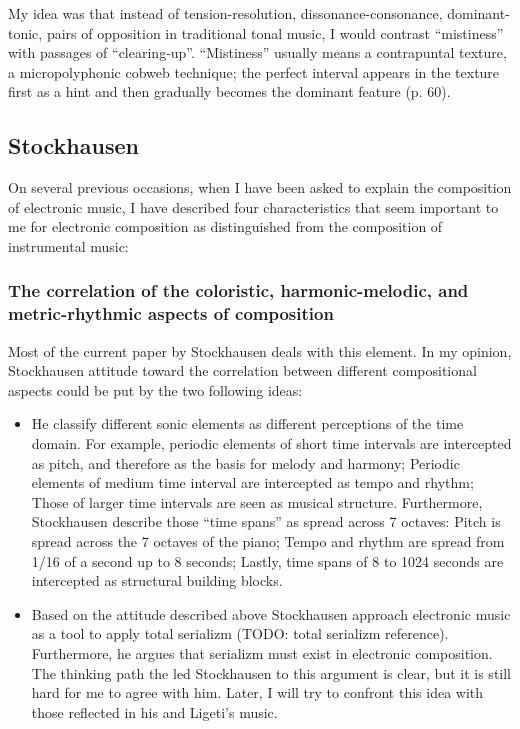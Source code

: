 \documentclass[a4paper,11pt]{article}
\begin{document}
My idea was that instead of tension-resolution, dissonance-consonance, dominant-tonic, pairs of opposition in traditional tonal music, I would contrast ``mistiness'' with passages of ``clearing-up''. ``Mistiness'' usually means a contrapuntal texture, a micropolyphonic cobweb technique; the perfect interval appears in the texture first as a hint and then gradually becomes the dominant feature (p. 60).

\subsection{Stockhausen}
\label{sub:eshtetic_stockhausen}

On several previous occasions, when I have been asked to explain the composition of electronic music, I have described four characteristics that seem important to me for electronic composition as distinguished from the composition of instrumental music:

\subsubsection{The correlation of the coloristic, harmonic-melodic, and metric-rhythmic aspects of composition}
\label{subs:stockhausen:time}

Most of the current paper by Stockhausen deals with this element.
In my opinion, Stockhausen attitude toward the correlation between different compositional aspects could be put by the two following ideas:

\begin{itemize}
    \item He classify different sonic elements as different perceptions of the time domain.
    For example, periodic elements of short time intervals are intercepted as pitch, and therefore as the basis for melody and harmony;
    Periodic elements of medium time interval are intercepted as tempo and rhythm;
    Those of larger time intervals are seen as musical structure.
    Furthermore, Stockhausen describe those ``time spans'' as spread across 7 octaves:
    Pitch is spread across the 7 octaves of the piano;
    Tempo and rhythm are spread from 1/16 of a second up to 8 seconds;
    Lastly, time spans of 8 to 1024 seconds are intercepted as structural building blocks.

    \item Based on the attitude described above Stockhausen approach electronic music as a tool to apply total serializm (TODO: {total serializm reference}).
    Furthermore, he argues that serializm must exist in electronic composition.
    The thinking path the led Stockhausen to this argument is clear, but it is still hard for me to agree with him.
    Later, I will try to confront this idea with those reflected in his and Ligeti's music.
\end{itemize}
\end{document}
